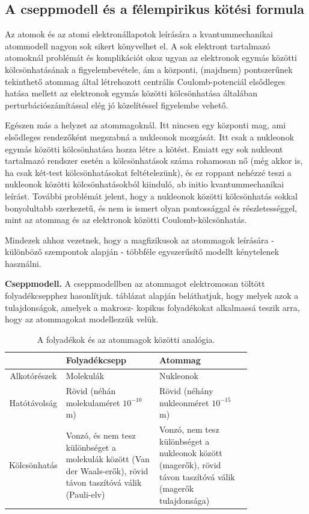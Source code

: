 \documentclass[../main.tex]{subfiles}
\begin{document}
\subsection{A cseppmodell és a félempirikus kötési formula}
Az atomok és az atomi elektronállapotok leírására a kvantummechanikai atommodell
nagyon sok sikert könyvelhet el. A sok elektront tartalmazó atomoknál problémát és
komplikációt okoz ugyan az elektronok egymás közötti kölcsönhatásának a figyelembevétele, ám a központi, (majdnem) pontszerűnek tekinthető atommag által létrehozott
centrális Coulomb-potenciál elsődleges hatása mellett az elektronok egymás közötti kölcsönhatása általában perturbációszámítással elég jó közelítéssel figyelembe vehető.

Egészen más a helyzet az atommagoknál. Itt nincsen egy központi mag, ami elsődleges rendezőként megszabná a nukleonok mozgását. Itt csak a nukleonok egymás közötti
kölcsönhatása hozza létre a kötést. Emiatt egy sok nukleont tartalmazó rendszer esetén
a kölcsönhatások száma rohamosan nő (még akkor is, ha csak két-test kölcsönhatásokat
feltételezünk), és ez roppant nehézzé teszi a nukleonok közötti kölcsönhatásokból kiinduló,
ab initio kvantummechanikai leírást. További problémát jelent, hogy a nukleonok
közötti kölcsönhatás sokkal bonyolultabb szerkezetű, és nem is ismert olyan pontossággal
és részletességgel, mint az atommag és az elektronok közötti Coulomb-kölcsönhatás.

Mindezek ahhoz vezetnek, hogy a magfizikusok az atommagok leírására - különböző
szempontok alapján - többféle egyszerűsítő modellt kénytelenek használni.

\textbf{Cseppmodell.} A cseppmodellben az atommagot elektromosan töltött folyadékcsepphez hasonlítjuk. táblázat alapján beláthatjuk, hogy melyek azok a tulajdonságok, amelyek a makrosz-
kopikus folyadékokat alkalmassá teszik arra, hogy az atommagokat modellezzük velük.
\begin{table}[H]
    \centering
    \begin{tabular}{|c|p{0.40\linewidth}|p{0.40\linewidth}|}
        \hline
        & \textbf{Folyadékcsepp} & \textbf{Atommag} \\
        \hline
        Alkotórészek & Molekulák & Nukleonok \\
        \hline
        Hatótávolság & Rövid (néhán molekulaméret $10^{-10}$ m) & Rövid (néhány nukleonméret $10^{-15}$ m)\\
        \hline
        Kölcsönhatás & Vonzó, és nem tesz különbséget a molekulák között (Van der Waals-erők), rövid távon taszítóvá válik (Pauli-elv) & Vonzó, nem tesz különbséget a nukleonok között (magerők), rövid távon taszítóvá válik (magerők tulajdonsága) \\
        \hline
    \end{tabular}
    \caption{A folyadékok és az atommagok közötti analógia.}
\end{table}
\end{document}
